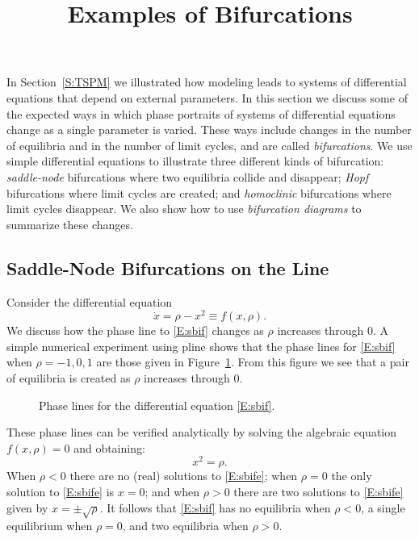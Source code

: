 \documentclass{ximera}
\title{Examples of Bifurcations}
\begin{document}
\begin{abstract}
\end{abstract}
\maketitle


\label{S:bifurcation} 

In Section~\ref{S:TSPM} we illustrated how modeling leads to systems 
of differential equations that depend on external parameters.  In this 
section we discuss some of the expected ways in which phase portraits of 
systems of differential equations change as a single parameter is varied.  
These ways include changes in the number of equilibria and in the number 
of limit cycles, and are called {\em bifurcations\/}.   We use simple 
differential equations to illustrate three different kinds of bifurcation: 
{\em saddle-node\/} bifurcations where two equilibria collide and disappear; 
{\em Hopf\/} bifurcations where limit cycles are created; and 
{\em homoclinic\/} bifurcations where limit cycles disappear.  We also show 
how to use {\em bifurcation diagrams\/} to summarize these changes.

\subsection*{Saddle-Node Bifurcations on the Line}

Consider the differential equation
\begin{equation}  \label{E:sbif}
\dot{x} = \rho - x^2 \equiv f(x,\rho).
\end{equation}
We discuss how the phase line to \eqref{E:sbif} changes as $\rho$ increases 
through $0$.  A simple numerical experiment using {\sf pline} shows that
the phase lines for \eqref{E:sbif} when $\rho=-1,0,1$ are those given in 
Figure~\ref{F:sbif}.  From this figure we see that a pair of equilibria 
is created as $\rho$ increases through $0$.

\vspace{0.4in}

\begin{figure}[htb]
           \centerline{%
           }
           \caption{Phase lines for the differential equation 
    		\protect\eqref{E:sbif}.}
           \label{F:sbif}
\end{figure}


These phase lines can be verified analytically by solving the 
algebraic equation $f(x,\rho)=0$ and obtaining:
\begin{equation} \label{E:sbife}
x^2 = \rho.
\end{equation}
When $\rho<0$ there are no (real) solutions to \eqref{E:sbife}; when
$\rho=0$ the only solution to \eqref{E:sbife} is $x=0$; and when $\rho>0$
there are two solutions to \eqref{E:sbife} given by $x=\pm\sqrt{\rho}$.
It follows that \eqref{E:sbif} has no equilibria when $\rho<0$, a single
equilibrium when $\rho=0$, and two equilibria when $\rho>0$.
\end{document}
